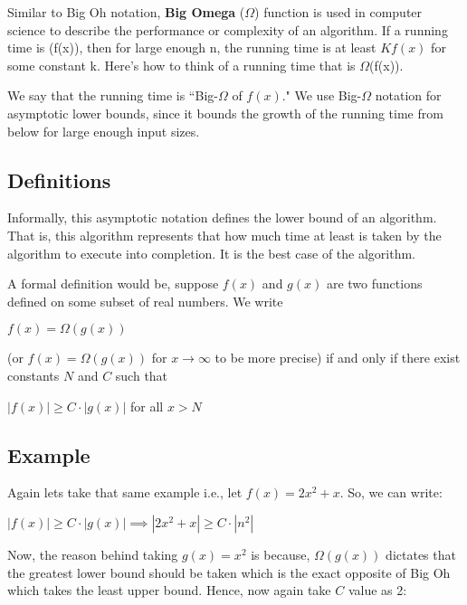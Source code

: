 \documentclass[a4paper,12pt]{article}
\theoremstyle{definition}
\begin{document}
    Similar to Big Oh notation, \textbf{Big Omega} ($\Omega$) function is used in computer science to describe the
    performance or complexity of an algorithm. If a running time is (f(x)), then for large enough n, the running
    time is at least $Kf(x)$ for some constant k. Here’s how to think of a running time that is $\Omega$(f(x)).

    We say that the running time is ``Big-$\Omega$ of $f(x)$." We use Big-$\Omega$ notation for asymptotic lower bounds,
    since it bounds the growth of the running time from below for large enough input sizes.

    \subsection{Definitions}

    Informally, this asymptotic notation defines the lower bound of an algorithm.
    That is, this algorithm represents that how much time at least is taken by the
    algorithm to execute into completion.
    It is the best case of the algorithm.

    A formal definition would be, suppose $f(x)$ and $g(x)$ are two functions defined on some subset of real numbers.
    We write

    \begin{center}
        $f(x) = \Omega(g(x))$
    \end{center}

    \noindent
    (or $f(x) = \Omega(g(x))$ for $x \rightarrow \infty$ to be more precise) if and only if there exist constants $N$ and $C$ such that

    \begin{center}
        $|f(x)| \geq C \cdot |g(x)|$ for all $x > N$
    \end{center}

    \subsection{Example}

    Again lets take that same example i.e., let $f(x) = 2x^2 + x$. So, we can write:

    \begin{center}
        $|f(x)| \geq C \cdot |g(x)| \implies |2x^2 + x| \geq C \cdot |n^2|$
    \end{center}

    \noindent
    Now, the reason behind taking $g(x) = x^2$ is because, $\Omega(g(x))$ dictates that the greatest lower bound should be
    taken which is the exact opposite of Big Oh which takes the least upper bound.
    Hence, now again take $C$ value as 2:
\end{document}
